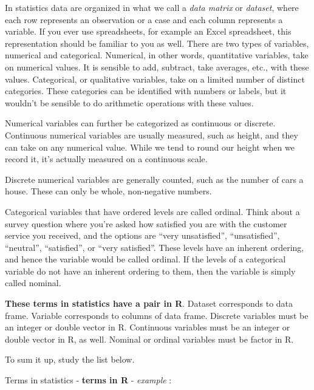 \documentclass[
]{book}
\begin{document}
In statistics data are organized in what we call a \emph{data matrix} or \emph{dataset}, where each row represents an observation or a case and each column represents a variable. If you ever use spreadsheets, for example an Excel spreadsheet, this representation should be familiar to you as well. There are two types of variables, numerical and categorical. Numerical, in other words, quantitative variables, take on numerical values. It is sensible to add, subtract, take averages, etc., with these values. Categorical, or qualitative variables, take on a limited number of distinct categories. These categories can be identified with numbers or labels, but it wouldn't be sensible to do arithmetic operations with these values.

Numerical variables can further be categorized as continuous or discrete. Continuous numerical variables are usually measured, such as height, and they can take on any numerical value. While we tend to round our height when we record it, it's actually measured on a continuous scale.

Discrete numerical variables are generally counted, such as the number of cars a house. These can only be whole, non-negative numbers.

Categorical variables that have ordered levels are called ordinal. Think about a survey question where you're asked how satisfied you are with the customer service you received, and the options are ``very unsatisfied'', ``unsatisfied'', ``neutral'', ``satisfied'', or ``very satisfied''. These levels have an inherent ordering, and hence the variable would be called ordinal. If the levels of a categorical variable do not have an inherent ordering to them, then the variable is
simply called nominal.

\textbf{These terms in statistics have a pair in R}. Dataset corresponds to data frame. Variable corresponds to columns of data frame. Discrete variables must be an integer or double vector in R. Continuous variables must be an integer or double vector in R, as well. Nominal or ordinal variables must be factor in R.

To sum it up, study the list below.

Terms in statistics - \textbf{terms in R} - \emph{example} :
\end{document}
